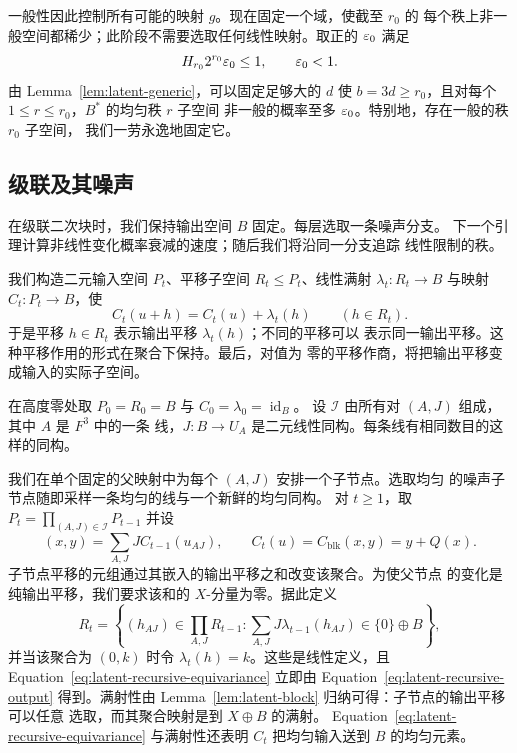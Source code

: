 一般性因此控制所有可能的映射 $g$。现在固定一个域，使截至 $r_0$ 的
每个秩上非一般空间都稀少；此阶段不需要选取任何线性映射。取正的
$\varepsilon_0$ 满足
\begin{equation}\label{eq:latent-generic-error}
 H_{r_0}2^{r_0}\varepsilon_0\le1,
 \qquad \varepsilon_0<1.
\end{equation}
由 Lemma~\ref{lem:latent-generic}，可以固定足够大的 $d$ 使
$b=3d\ge r_0$，且对每个 $1\le r\le r_0$，$B^*$ 的均匀秩 $r$ 子空间
非一般的概率至多 $\varepsilon_0$。特别地，存在一般的秩 $r_0$ 子空间，
我们一劳永逸地固定它。

\subsection{级联及其噪声}

在级联二次块时，我们保持输出空间 $B$ 固定。每层选取一条噪声分支。
下一个引理计算非线性变化概率衰减的速度；随后我们将沿同一分支追踪
线性限制的秩。

我们构造二元输入空间 $P_t$、平移子空间 $R_t\le P_t$、线性满射
$\lambda_t:R_t\to B$ 与映射 $C_t:P_t\to B$，使
\begin{equation}\label{eq:latent-recursive-equivariance}
 C_t(u+h)=C_t(u)+\lambda_t(h)
 \qquad(h\in R_t).
\end{equation}
于是平移 $h\in R_t$ 表示输出平移 $\lambda_t(h)$；不同的平移可以
表示同一输出平移。这种平移作用的形式在聚合下保持。最后，对值为
零的平移作商，将把输出平移变成输入的实际子空间。

在高度零处取 $P_0=R_0=B$ 与 $C_0=\lambda_0=\operatorname{id}_B$。
设 $\mathcal I$ 由所有对 $(A,J)$ 组成，其中 $A$ 是 $F^3$ 中的一条
线，$J:B\to U_A$ 是二元线性同构。每条线有相同数目的这样的同构。

我们在单个固定的父映射中为每个 $(A,J)$ 安排一个子节点。选取均匀
的噪声子节点随即采样一条均匀的线与一个新鲜的均匀同构。
对 $t\ge1$，取 $P_t=\prod_{(A,J)\in\mathcal I}P_{t-1}$ 并设
\begin{equation}\label{eq:latent-recursive-output}
 (x,y)=\sum_{A,J}J C_{t-1}(u_{AJ}),
 \qquad C_t(u)=C_{\mathrm{blk}}(x,y)=y+Q(x).
\end{equation}
子节点平移的元组通过其嵌入的输出平移之和改变该聚合。为使父节点
的变化是纯输出平移，我们要求该和的 $X$-分量为零。据此定义
\begin{equation}\label{eq:latent-recursive-shifts}
 R_t=\left\{(h_{AJ})\in\prod_{A,J}R_{t-1}:
       \sum_{A,J}J\lambda_{t-1}(h_{AJ})\in\{0\}\oplus B\right\},
\end{equation}
并当该聚合为 $(0,k)$ 时令 $\lambda_t(h)=k$。这些是线性定义，且
Equation~\eqref{eq:latent-recursive-equivariance} 立即由
Equation~\eqref{eq:latent-recursive-output} 得到。满射性由
Lemma~\ref{lem:latent-block} 归纳可得：子节点的输出平移可以任意
选取，而其聚合映射是到 $X\oplus B$ 的满射。
Equation~\eqref{eq:latent-recursive-equivariance} 与满射性还表明
$C_t$ 把均匀输入送到 $B$ 的均匀元素。

